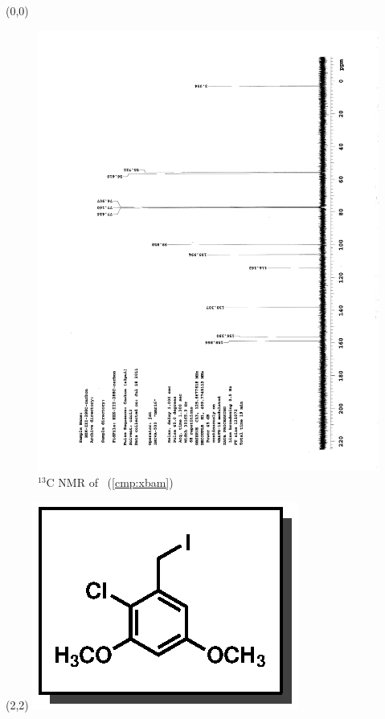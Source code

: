 \clearpage
\begin{textblock}{20}(0,0)
\begin{figure}[htb]
\caption{$^{13}$C NMR of  \CMPxbam\ (\ref{cmp:xbam})}
\includegraphics[scale=0.75, trim = 0mm 0mm 0mm 5mm,
clip]{chp_singlecarbon/images/nmr/xbamC}
\vspace{-100pt}
\end{figure}
\end{textblock}
\begin{textblock}{1}(2,2)
\includegraphics[scale=0.8, angle=90]{chp_singlecarbon/images/xbam}
\end{textblock}
\clearpage

